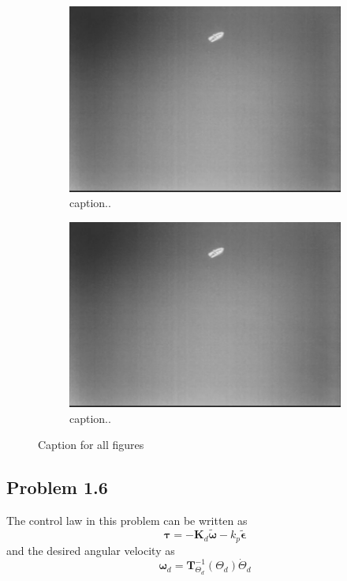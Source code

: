 \begin{figure}[ht]
	\begin{subfigure}[b]{0.45\textwidth}
		\includegraphics[width=\textwidth]{fig1}
		\caption{caption..}
		\label{fig:2c}
	\end{subfigure}
	\begin{subfigure}[b]{0.45\textwidth}
		\includegraphics[width=\textwidth]{fig1}
		\caption{caption..}
		\label{fig:2d}
	\end{subfigure}
	\caption{Caption for all figures}\label{fig:2}
\end{figure}


\subsection{Problem 1.6}
The control law in this problem can be written as
\begin{equation}
	\boldsymbol{\tau} = -\mathbf{K}_d \tilde{\boldsymbol{\omega}} - k_p \tilde{\boldsymbol{\epsilon}}
\end{equation}
and the desired angular velocity as
\begin{equation}
	\boldsymbol{\omega}_d = \mathbf{T}^{-1}_{\Theta_d}(\Theta_d)\dot{\Theta}_d
\end{equation}

